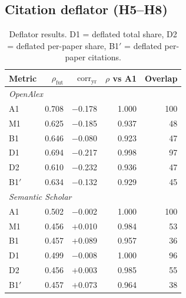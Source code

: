 \documentclass{article}
\begin{document}
\subsection{Citation deflator (H5--H8)}

\begin{table}[h]
\caption{Deflator results. D1 = deflated total share, D2 = deflated per-paper share,
  B1$'$ = deflated per-paper citations.}
\label{tab:deflator}
\centering
\footnotesize
\setlength{\tabcolsep}{3.5pt}
\begin{tabular}{lrrrr}
\toprule
\textbf{Metric} & $\rho_{\text{fut}}$ & $\text{corr}_{\text{yr}}$ & $\rho$ vs A1 & \textbf{Overlap} \\
\midrule
\multicolumn{5}{l}{\textit{OpenAlex}} \\
A1  & 0.708 & $-$0.178 & 1.000 & 100 \\
M1  & 0.625 & $-$0.185 & 0.937 & 48 \\
B1  & 0.646 & $-$0.080 & 0.923 & 47 \\
D1  & 0.694 & $-$0.217 & 0.998 & 97 \\
D2  & 0.610 & $-$0.232 & 0.936 & 47 \\
B1$'$ & 0.634 & $-$0.132 & 0.929 & 45 \\
\midrule
\multicolumn{5}{l}{\textit{Semantic Scholar}} \\
A1  & 0.502 & $-$0.002 & 1.000 & 100 \\
M1  & 0.456 & $+$0.010 & 0.984 & 53 \\
B1  & 0.457 & $+$0.089 & 0.957 & 36 \\
D1  & 0.499 & $-$0.008 & 1.000 & 96 \\
D2  & 0.456 & $+$0.003 & 0.985 & 55 \\
B1$'$ & 0.457 & $+$0.073 & 0.964 & 38 \\
\bottomrule
\end{tabular}
\end{table}
\end{document}

